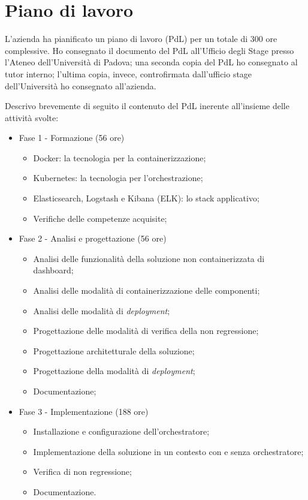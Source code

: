 \section{Piano di lavoro}
\label{sec:piano-di-lavoro}
L'azienda ha pianificato un piano di lavoro (PdL) per un totale di 300 ore 
complessive. 
Ho consegnato il documento del PdL all'Ufficio degli Stage presso l'Ateneo 
dell'Università di Padova; una seconda copia del PdL ho consegnato al tutor 
interno; l'ultima copia, invece, 
controfirmata dall'ufficio stage dell'Università ho consegnato all'azienda.

Descrivo brevemente di seguito il contenuto del PdL inerente all'insieme delle 
attività svolte:
\begin{itemize}
\item Fase 1 - Formazione  (56 ore)
	\begin{itemize}
		\item Docker: la tecnologia per la containerizzazione;
		\item Kubernetes: la tecnologia per l'orchestrazione;
		\item Elasticsearch, Logstash e Kibana (ELK): lo stack 
applicativo;
		\item Verifiche delle competenze acquisite;
	\end{itemize}
\item Fase 2 - Analisi e progettazione  (56 ore)
	\begin{itemize}
		\item Analisi delle funzionalità della soluzione non 
containerizzata di dashboard;
		\item Analisi delle modalità di containerizzazione delle 
componenti;
		\item Analisi delle modalità di \textit{deployment};
		\item Progettazione delle modalità di verifica della non 
regressione;
		\item Progettazione architetturale della soluzione; 
		\item Progettazione della modalità di \textit{deployment};
		\item Documentazione;
	\end{itemize}
\item Fase 3 - Implementazione  (188 ore)	
	\begin{itemize}
		\item Installazione e configurazione dell'orchestratore;
		\item Implementazione della soluzione in un contesto con e 
senza orchestratore;
		\item Verifica di non regressione;
		\item Documentazione.
	\end{itemize}
\end{itemize}

